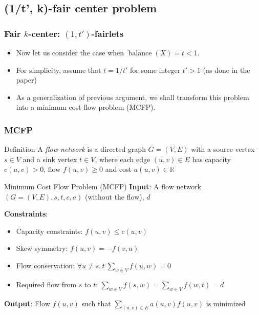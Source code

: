 \documentclass{beamer}
\DeclareMathOperator{\balance}{balance}
\begin{document}
\subsection{(1/t', k)-fair center problem}

\begin{frame}
\frametitle{Fair $k$-center: $(1, t')$-fairlets}

\begin{itemize}
	\item Now let us consider the case when $\balance(X) = t < 1$. \pause
	
	\item For simplicity, assume that $t = 1/t'$ for some integer $t' > 1$ (as done in the paper) \pause
	
	\item As a generalization of previous argument, we shall transform this problem into a \alert{minimum cost flow problem (MCFP)}.
\end{itemize}

\end{frame}



\begin{frame}
\frametitle{MCFP}

\begin{block}{Definition}
A {\it flow network} is a directed graph $G = (V, E)$ with a source vertex $s \in V$ and a sink vertex $t \in V$,
where each edge $(u, v) \in E$ has capacity $c(u, v) > 0$, flow $f(u, v) \geq 0$ and cost $a(u, v) \in \mathbb{R}$

\end{block}

\begin{block}{Minimum Cost Flow Problem (MCFP)}
{\bf Input}: A flow network $(G = (V, E), s, t, c, a)$ (without the flow), $d$

{\bf Constraints}:
\begin{itemize}
	\item Capacity constraints: $f(u, v) \leq c(u, v)$
	\item Skew symmetry: $f(u, v) = -f(v, u)$
	\item Flow conservation: $\forall u \not= s, t \ \sum_{w \in V} f(u, w) = 0$
	\item Required flow from $s$ to $t$: $\sum_{w \in V} f(s, w) = \sum_{w \in V} f(w, t) = d$
\end{itemize}

{\bf Output}: Flow $f(u, v)$ such that $\sum_{(u, v) \in E} a(u, v) f(u, v)$ is minimized

\end{block}

\end{frame}
\end{document}
